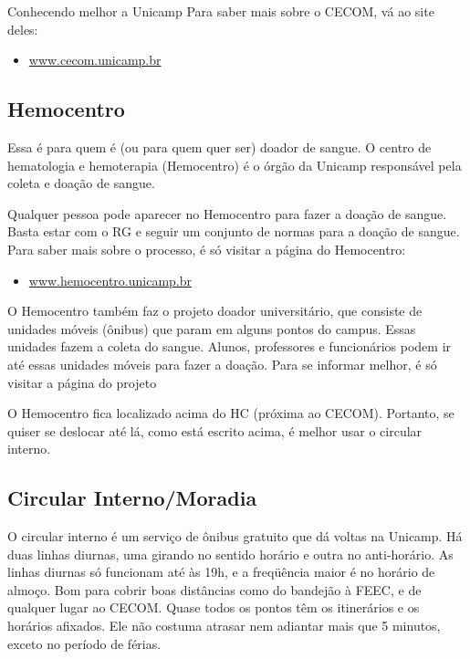 \begin{story}{Conhecendo melhor a Unicamp}
Para saber mais sobre o CECOM, vá ao site deles:

\begin{itemize}
\item \url{www.cecom.unicamp.br}
\end{itemize}

\subsection*{Hemocentro}

Essa é para quem é (ou para quem quer ser) doador de sangue. O centro de hematologia e hemoterapia (Hemocentro) é o órgão da Unicamp responsável pela coleta e doação de sangue.

Qualquer pessoa pode aparecer no Hemocentro para fazer a doação de sangue. Basta estar com o RG e seguir um conjunto de normas para a doação de sangue. Para saber mais sobre o processo, é só visitar a página do Hemocentro:

\begin{itemize}
\item \url{www.hemocentro.unicamp.br}
\end{itemize}

O Hemocentro também faz o projeto doador universitário, que consiste de unidades móveis (ônibus) que param em alguns pontos do campus. Essas unidades fazem a coleta do sangue. Alunos, professores e funcionários podem ir até essas unidades móveis para fazer a doação. Para se informar melhor, é só visitar a página do projeto

O Hemocentro fica localizado acima do HC (próxima ao CECOM). Portanto, se quiser se deslocar até lá, como está escrito acima, é melhor usar o circular interno.

\subsection*{Circular Interno/Moradia}

O circular interno é um serviço de ônibus gratuito que dá voltas na Unicamp. Há duas linhas diurnas, uma girando no sentido horário e outra no anti-horário. As linhas diurnas só funcionam até às 19h, e a freqüência maior é no horário de almoço. Bom para cobrir boas distâncias como do bandejão à FEEC, e de qualquer lugar ao CECOM. Quase todos os pontos têm os itinerários e os horários afixados. Ele não costuma atrasar nem adiantar mais que 5 minutos, exceto no período de férias.


\end{story}
